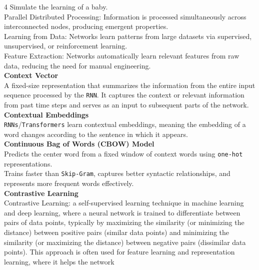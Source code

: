\documentclass[8pt]{extarticle}
\begin{document}
\begin{multicols}{4}
Simulate the learning of a baby.\\
Parallel Distributed Processing: Information is processed simultaneously across interconnected nodes, producing emergent properties.\\
Learning from Data: Networks learn patterns from large datasets via supervised, unsupervised, or reinforcement learning.\\
Feature Extraction: Networks automatically learn relevant features from raw data, reducing the need for manual engineering.\\
\vspace{2pt}\textbf{Context Vector}\\
A fixed-size representation that summarizes the information from the entire input sequence processed by the \texttt{RNN}. It captures the context or relevant information from past time steps and serves as an input to subsequent parts of the network.\\
\vspace{2pt}\textbf{Contextual Embeddings}\\
\texttt{RNNs}/\texttt{Transformers} learn contextual embeddings, meaning the embedding of a word changes according to the sentence in which it appears.\\
\vspace{2pt}\textbf{Continuous Bag of Words (CBOW) Model}\\
Predicts the center word from a fixed window of context words using \texttt{one-hot} representations.\\
Trains faster than \texttt{Skip-Gram}, captures better syntactic relationships, and represents more frequent words effectively.\\
\vspace{2pt}\textbf{Contrastive Learning}\\
Contrastive Learning: a self-supervised learning technique in machine learning and deep learning, where a neural network is trained to differentiate between pairs of data points, typically by maximizing the similarity (or minimizing the distance) between positive pairs (similar data points) and minimizing the similarity (or maximizing the distance) between negative pairs (dissimilar data points). This approach is often used for feature learning and representation learning, where it helps the network


\end{multicols}
\end{document}
